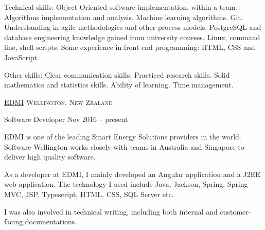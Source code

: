 \documentclass[10pt,a4paper]{article}
\begin{document}
\vspace{0.5em}

\inlineheadsection  %
  {Technical skills:}
  {
    Object Oriented software implementation, within a team.
    Algorithms implementation and analysis.
    Machine learning algorithms.
    Git.
    Understanding in agile methodologies and other process models.
    PostgreSQL and database engineering knowledge gained from university courses.
    Linux, command line, shell scripts.
    Some experience in front end programming: HTML, CSS and JavaScript.
  }

\vspace{0.5em}

\inlineheadsection  %
  {Other skills:}
  {
    Clear communication skills.
    Practiced research skills.
    Solid mathematics and statistics skills.
    Ability of learning.
    Time management.
  }


\spacedhrule{1.6em}{-0.4em}


\headedsection
  {\href{http://www.edmi-meters.com/}{EDMI}}
  {\textsc{Wellington, New Zealand}}
  {

    \headedsubsection
      {Software Developer}
      {Nov 2016 -- present}
      {\bodytext
        {
          EDMI is one of the leading Smart Energy Solutions providers in the world.
          Software Wellington works closely with teams in Australia and Singapore to deliver high quality software.

          As a developer at EDMI, I mainly developed an Angular application and a J2EE web application.
          The technology I used include Java, Jackson, Spring, Spring MVC, JSP, Typescript, HTML, CSS, SQL Server etc.

          I was also involved in technical writing, including both internal and customer-facing documentations.

        }
      }
  }
\end{document}
